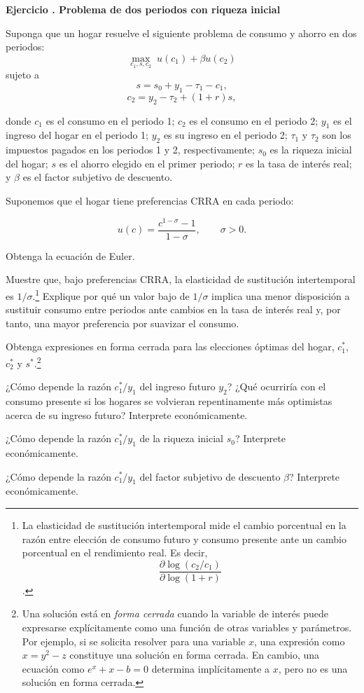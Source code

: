 \documentclass[11pt]{article}
\let\enumerateoriginal\enumerate
\let\endenumerateoriginal\endenumerate
\renewenvironment{enumerate}{%
  \enumerateoriginal
  \setlength{\itemsep}{0.5em}%
  \setlength{\parsep}{0pt}%
  \setlength{\topsep}{0.4em}%
}{\endenumerateoriginal}
\newcounter{problema}
\newenvironment{problema}[1]{%
  \par
  \refstepcounter{problema}%
  \addvspace{0.9em}%
  \noindent\textbf{Ejercicio \theproblema. #1}
  \par\nobreak\smallskip
}{\par}
\begin{document}
\begin{problema}{Problema de dos periodos con riqueza inicial}
\label{Ej:P2P}
Suponga que un hogar resuelve el siguiente problema de consumo y ahorro en dos periodos:
\[
    \max_{c_1,s,c_2}\; u(c_1)+\beta u(c_2)
\]
sujeto a
\[
    s=s_0+y_1-\tau_1-c_1,
\]
\[
    c_2=y_2-\tau_2+(1+r)s,
\]

donde $c_1$ es el consumo en el periodo 1; $c_2$ es el consumo en el periodo 2; $y_1$ es el ingreso del hogar en el periodo 1; $y_2$ es su ingreso en el periodo 2; $\tau_1$ y $\tau_2$ son los impuestos pagados en los periodos 1 y 2, respectivamente; $s_0$ es la riqueza inicial del hogar; $s$ es el ahorro elegido en el primer periodo; $r$ es la tasa de interés real; y $\beta$ es el factor subjetivo de descuento.

Suponemos que el hogar tiene preferencias CRRA en cada periodo: 

\[
    u(c)=\frac{c^{1-\sigma}-1}{1-\sigma}, \qquad \sigma >0.
\]

\begin{enumerate}
    \item Obtenga la ecuación de Euler.
    \item Muestre que, bajo preferencias CRRA, la elasticidad de sustitución intertemporal es $1/\sigma$.\footnote{La elasticidad de sustitución intertemporal mide el cambio porcentual en la razón entre elección de consumo futuro y consumo presente ante un cambio porcentual en el rendimiento real. Es decir,
      \[
        \frac{\partial\log(c_2/c_1)}{\partial\log(1+r)}
      \].} Explique por qué un valor bajo de $1/\sigma$ implica una menor disposición a sustituir consumo entre periodos ante cambios en la tasa de interés real y, por tanto, una mayor preferencia por suavizar el consumo.

    \item Obtenga expresiones en forma cerrada para las elecciones óptimas del hogar, $c_1^*$, $c_2^*$ y $s^*$.\footnote{Una solución está en \textit{forma cerrada} cuando la variable de interés puede expresarse explícitamente como una función de otras variables y parámetros. Por ejemplo, si se solicita resolver para una variable $x$, una expresión como $x=y^2-z$ constituye una solución en forma cerrada. En cambio, una ecuación como $e^x+x-b=0$ determina implícitamente a $x$, pero no es una solución en forma cerrada.}

    \item ¿Cómo depende la razón $c_1^*/y_1$ del ingreso futuro $y_2$? ¿Qué ocurriría con el consumo presente si los hogares se volvieran repentinamente más optimistas acerca de su ingreso futuro? Interprete económicamente.

    \item ¿Cómo depende la razón $c_1^*/y_1$ de la riqueza inicial $s_0$? Interprete económicamente.

    \item ¿Cómo depende la razón $c_1^*/y_1$ del factor subjetivo de descuento $\beta$? Interprete económicamente.
\end{enumerate}

\end{problema}
\end{document}
